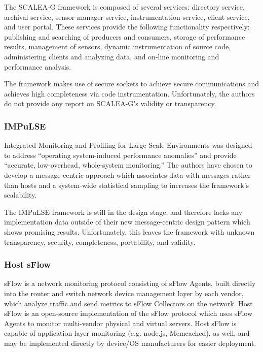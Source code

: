 The SCALEA-G framework is composed of several services: directory service, archival service, sensor manager service,
instrumentation service, client service, and user portal. These services provide the following functionality
respectively: publishing and searching of producers and consumers, storage of performance results, management of
sensors, dynamic instrumentation of source code, administering clients and analyzing data, and on-line monitoring and
performance analysis.

The framework makes use of secure sockets to achieve secure communications and achieves high completeness via code
instrumentation. Unfortunately, the authors do not provide any report on SCALEA-G's validity or transparency.

\subsubsection{IMPuLSE}

Integrated Monitoring and Profiling for Large Scale Environments \cite{bridges2004} was designed to address ``operating
system-induced performance anomalies'' and provide ``accurate, low-overhead, whole-system monitoring.'' The authors have
chosen to develop a message-centric approach which associates data with messages rather than hosts and a system-wide
statistical sampling to increases the framework's scalability.

The IMPuLSE framework is still in the design stage, and therefore lacks any implementation data outside of their new
message-centric design pattern which shows promising results. Unfortunately, this leaves the framework with unknown
transparency, security, completeness, portability, and validity.

\subsubsection{Host sFlow}

sFlow is a network monitoring protocol consisting of sFlow Agents, built directly into the router and switch network
device management layer by each vendor, which analyze traffic and send metrics to sFlow Collectors on the network.
\cite{sflow} Host sFlow is an open-source implementation of the sFlow protocol which uses sFlow Agents to monitor
multi-vendor physical and virtual servers. Host sFlow is capable of application layer monitoring (e.g. node.js,
Memcached), as well, and may be implemented directly by device/OS manufacturers for easier deployment. \cite{host-sflow}

